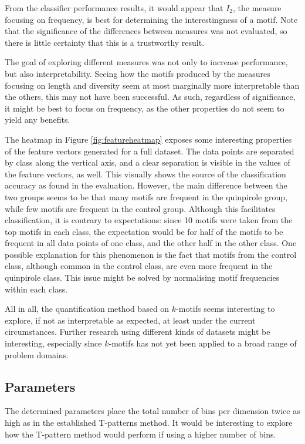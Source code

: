 \documentclass[conference,a4paper,twoside]{IEEEtran}
\begin{document}
From the classifier performance results, it would appear that $I_2$, the measure focusing on frequency, is best for determining the interestingness of a motif. Note that the significance of the differences between measures was not evaluated, so there is little certainty that this is a trustworthy result.

The goal of exploring different measures was not only to increase performance, but also interpretability. Seeing how the motifs produced by the measures focusing on length and diversity seem at most marginally more interpretable than the others, this may not have been successful. As such, regardless of significance, it might be best to focus on frequency, as the other properties do not seem to yield any benefits.

The heatmap in Figure \ref{fig:featureheatmap} exposes some interesting properties of the feature vectors generated for a full dataset. The data points are separated by class along the vertical axis, and a clear separation is visible in the values of the feature vectors, as well. This visually shows the source of the classification accuracy as found in the evaluation. However, the main difference between the two groups seems to be that many motifs are frequent in the quinpirole group, while few motifs are frequent in the control group. Although this facilitates classification, it is contrary to expectations: since 10 motifs were taken from the top motifs in each class, the expectation would be for half of the motifs to be frequent in all data points of one class, and the other half in the other class. One possible explanation for this phenomenon is the fact that motifs from the control class, although common in the control class, are even more frequent in the quinpirole class. This issue might be solved by normalising motif frequencies within each class.

All in all, the quantification method based on $k$-motifs seems interesting to explore, if not as interpretable as expected, at least under the current circumstances. Further research using different kinds of datasets might be interesting, especially since $k$-motifs has not yet been applied to a broad range of problem domains.

\subsection{Parameters}
\label{sec:disc_parameters}
The determined parameters place the total number of bins per dimension twice as high as in the established T-patterns method. It would be interesting to explore how the T-pattern method would perform if using a higher number of bins.
\end{document}
